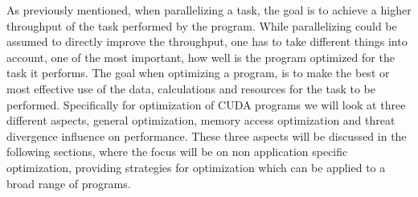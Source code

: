 As previously mentioned, when parallelizing a task, the goal is to achieve a higher throughput of the task performed by the program. While parallelizing could be assumed to directly improve the throughput, one has to take different things into account, one of the most important, how well is the program optimized for the task it performs. The goal when optimizing a program, is to make the best or most effective use of the data, calculations and resources for the task to be performed. Specifically for optimization of CUDA programs we will look at three different aspects, general optimization, memory access optimization and threat divergence influence on performance. These three aspects will be discussed in the following sections, where the focus will be on non application specific optimization, providing strategies for optimization which can be applied to a broad range of programs. 
